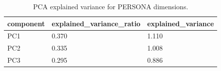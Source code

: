 \begin{table}[t]
\centering
\caption{PCA explained variance for PERSONA dimensions.}
\label{tab:pca_var}
\begin{tabular}{lll}
\toprule
component & explained\_variance\_ratio & explained\_variance \\
\midrule
PC1 & 0.370 & 1.110 \\
PC2 & 0.335 & 1.008 \\
PC3 & 0.295 & 0.886 \\
\bottomrule
\end{tabular}
\end{table}
